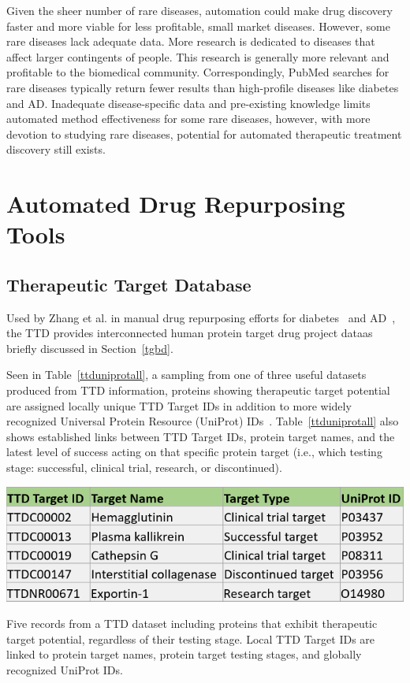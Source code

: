 \documentclass{IEEEtran}
\begin{document}
	Given the sheer number of rare diseases, automation could make drug discovery faster and more viable for less profitable, small market diseases.  However, some rare diseases lack adequate data. More research is dedicated to diseases that affect larger contingents of people. This research is generally more relevant and profitable to the biomedical community.  Correspondingly, PubMed searches for rare diseases typically return fewer results than high-profile diseases like diabetes and AD.  Inadequate disease-specific data and pre-existing knowledge limits automated method effectiveness for some rare diseases, however, with more devotion to studying rare diseases, potential for automated therapeutic treatment discovery still exists.
	
	
	\section{Automated Drug Repurposing Tools}
	\subsection{Therapeutic Target Database}
	Used by Zhang et al. in manual drug repurposing efforts for diabetes~\cite{zhang15} and AD~\cite{zhang16}, the TTD provides interconnected human protein target drug project data\textemdash as briefly discussed in Section~\ref{tgbd}.
	
	Seen in Table~\ref{ttduniprotall}, a sampling from one of three useful datasets produced from TTD information, proteins showing therapeutic target potential are assigned locally unique TTD Target IDs in addition to more widely recognized Universal Protein Resource (UniProt) IDs~\cite{ttd10}. Table~\ref{ttduniprotall} also shows established links between TTD Target IDs, protein target names, and the latest level of success acting on that specific protein target (i.e., which testing stage: successful, clinical trial, research, or discontinued).
	\begin{table}[h]
		\centering
		\includegraphics[width=\linewidth]{ttduniprotall}
		\caption{\footnotesize Five records from a TTD dataset including proteins that exhibit therapeutic target potential, regardless of their testing stage.  Local TTD Target IDs are linked to protein target names, protein target testing stages, and globally recognized UniProt IDs.}
		\label{ttduniprotall}
	\end{table} 
\end{document}
